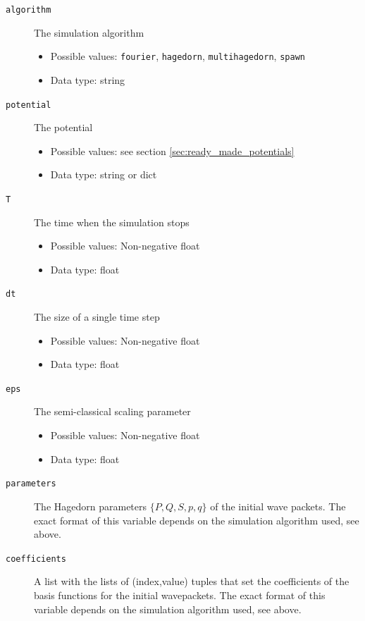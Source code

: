 \documentclass[a4paper,10pt]{report}
\begin{document}
\begin{description}
  \item[\texttt{algorithm}] The simulation algorithm
  \begin{itemize}
    \item Possible values: \texttt{fourier}, \texttt{hagedorn}, \texttt{multihagedorn}, \texttt{spawn}
    \item Data type: string
  \end{itemize}

  \item[\texttt{potential}] The potential
  \begin{itemize}
    \item Possible values: see section \ref{sec:ready_made_potentials}
    \item Data type: string or dict
  \end{itemize}

  \item[\texttt{T}] The time when the simulation stops
  \begin{itemize}
    \item Possible values: Non-negative float
    \item Data type: float
  \end{itemize}

  \item[\texttt{dt}] The size of a single time step
  \begin{itemize}
    \item Possible values: Non-negative float
    \item Data type: float
  \end{itemize}

  \item[\texttt{eps}] The semi-classical scaling parameter
  \begin{itemize}
    \item Possible values: Non-negative float
    \item Data type: float
  \end{itemize}

  \item[\texttt{parameters}] The Hagedorn parameters $\{P, Q, S, p, q \}$ of the
    initial wave packets. The exact format of this variable depends on the
    simulation algorithm used, see above.

  \item[\texttt{coefficients}] A list with the lists of (index,value) tuples that
    set the coefficients of the basis functions for the initial wavepackets. The
    exact format of this variable depends on the simulation algorithm used, see above.


\end{description}
\end{document}
